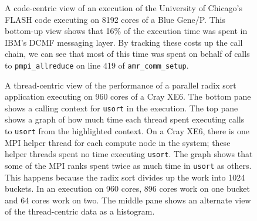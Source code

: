 \documentclass[11pt,letterpaper]{report}
\begin{document}
\begin{figure}[t]
\caption{A code-centric view of an execution of the University of Chicago's FLASH code executing on 8192 cores of a Blue Gene/P. This bottom-up view shows that 16\% of the execution time was spent in IBM's DCMF messaging layer. By tracking these costs up the call chain, we can see that most of this time   was spent on behalf of calls to {\tt pmpi\_allreduce} on line 419 of {\tt amr\_comm\_setup}.}
\label{fig:code-centric}
\end{figure}

\begin{figure}[t]
\caption{A thread-centric view of the performance of a parallel radix sort application executing on 960 cores of a Cray XE6. The bottom pane shows a calling context for {\tt usort} in the execution. The top pane shows a graph of how much time each thread spent executing calls to {\tt usort} from the   highlighted context.  On a Cray XE6, there is one MPI helper thread for each compute node in the system; these helper threads spent no time executing {\tt usort}. The graph shows that some of the MPI ranks spent twice as much time in {\tt usort} as others. This happens because the radix sort divides up the work into 1024 buckets. In an execution on 960 cores,  896 cores work on one bucket and 64 cores work on two. The middle pane shows an alternate view of the thread-centric data as a histogram.}
\label{fig:thread-centric}
\end{figure}
\end{document}
